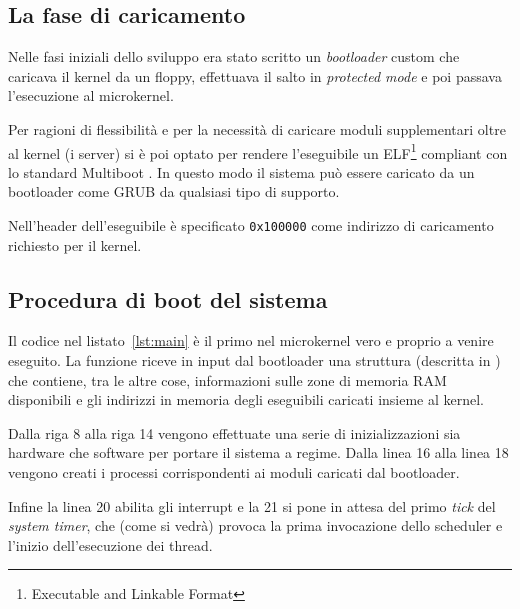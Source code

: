 \documentclass[12pt,a4paper]{report}
\begin{document}
		\subsection{La fase di caricamento}
			Nelle fasi iniziali dello sviluppo era stato scritto un \emph{bootloader} custom che caricava il kernel
			da un floppy, effettuava il salto in \emph{protected mode} e poi passava l'esecuzione al microkernel.
			
			Per ragioni di flessibilità e per la necessità di caricare moduli supplementari oltre al kernel (i server)
			si è poi optato per rendere l'eseguibile un ELF\footnote{Executable and Linkable Format} compliant con lo standard Multiboot \cite{Multiboot}.
			In questo modo il sistema può essere caricato da un bootloader come GRUB da qualsiasi tipo di supporto.
			
			Nell'header dell'eseguibile è specificato \texttt{0x100000} come indirizzo di caricamento richiesto per il kernel.
			
		\subsection{Procedura di boot del sistema}			
			Il codice nel listato~\ref{lst:main} è il primo nel microkernel vero e proprio a venire eseguito.
			La funzione riceve in input dal bootloader una struttura (descritta in \cite{Multiboot}) che contiene,
			tra le altre cose, informazioni sulle zone di memoria RAM disponibili e gli indirizzi in memoria
			degli eseguibili caricati insieme al kernel.
			
			
			
			Dalla riga 8 alla riga 14 vengono effettuate una serie di inizializzazioni sia hardware che software
			per portare il sistema a regime. Dalla linea 16 alla linea 18 vengono creati i processi corrispondenti
			ai moduli caricati dal bootloader.
			
			Infine la linea 20 abilita gli interrupt e la 21 si pone in attesa del primo \emph{tick} del \emph{system timer},
			che (come si vedrà) provoca la prima invocazione dello scheduler e l'inizio dell'esecuzione dei thread.
			
\end{document}
